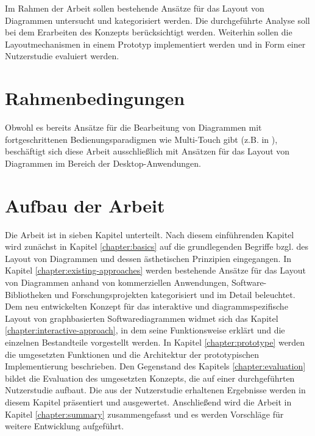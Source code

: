 
Im Rahmen der Arbeit sollen bestehende Ansätze für das Layout von Diagrammen untersucht und kategorisiert werden. Die durchgeführte Analyse soll bei dem Erarbeiten des Konzepts berücksichtigt werden. Weiterhin sollen die Layoutmechanismen in einem Prototyp implementiert werden und in Form einer Nutzerstudie evaluiert werden.


\section{Rahmenbedingungen}
\label{sec:thesis-conditions}

Obwohl es bereits Ansätze für die Bearbeitung von Diagrammen mit fortgeschrittenen Bedienungsparadigmen wie Multi-Touch gibt (z.B. in \cite{FrischHeydekorn10Diagram}), beschäftigt sich diese Arbeit ausschließlich mit Ansätzen für das Layout von Diagrammen im Bereich der Desktop-Anwendun\-gen.


\section{Aufbau der Arbeit}

Die Arbeit ist in sieben Kapitel unterteilt. Nach diesem einführenden Kapitel wird zunächst in Kapitel \ref{chapter:basics} auf die grundlegenden Begriffe bzgl. des Layout von Diagrammen und dessen ästhetischen Prinzipien eingegangen. In Kapitel \ref{chapter:existing-approaches} werden bestehende Ansätze für das Layout von Diagrammen anhand von kommerziellen Anwendungen, Software-Bibliotheken und Forschungsprojekten kategorisiert und im Detail beleuchtet. Dem neu entwickelten Konzept für das interaktive und diagrammspezifische Layout von graphbasierten Softwarediagrammen widmet sich das Kapitel \ref{chapter:interactive-approach}, in dem seine Funktionsweise erklärt und die einzelnen Bestandteile vorgestellt werden. In Kapitel \ref{chapter:prototype} werden die umgesetzten Funktionen und die Architektur der prototypischen Implementierung beschrieben. Den Gegenstand des Kapitels \ref{chapter:evaluation} bildet die Evaluation des umgesetzten Konzepts, die auf einer durchgeführten Nutzerstudie aufbaut. Die aus der Nutzerstudie erhaltenen Ergebnisse werden in diesem Kapitel präsentiert und ausgewertet. Anschließend wird die Arbeit in Kapitel \ref{chapter:summary} zusammengefasst und es werden Vorschläge für weitere Entwicklung aufgeführt.
